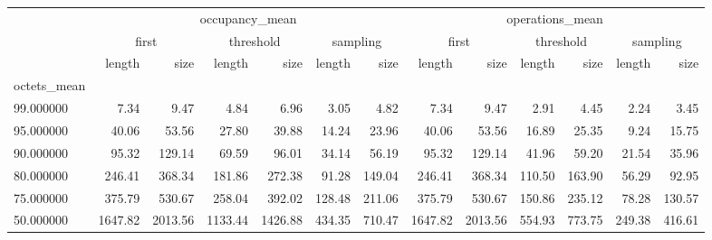 \begin{tabular}{lrrrrrrrrrrrr}
\toprule
 & \multicolumn{6}{c}{occupancy_mean} & \multicolumn{6}{c}{operations_mean} \\
 & \multicolumn{2}{c}{first} & \multicolumn{2}{c}{threshold} & \multicolumn{2}{c}{sampling} & \multicolumn{2}{c}{first} & \multicolumn{2}{c}{threshold} & \multicolumn{2}{c}{sampling} \\
 & length & size & length & size & length & size & length & size & length & size & length & size \\
octets_mean &  &  &  &  &  &  &  &  &  &  &  &  \\
\midrule
99.000000 & 7.34 & 9.47 & 4.84 & 6.96 & 3.05 & 4.82 & 7.34 & 9.47 & 2.91 & 4.45 & 2.24 & 3.45 \\
95.000000 & 40.06 & 53.56 & 27.80 & 39.88 & 14.24 & 23.96 & 40.06 & 53.56 & 16.89 & 25.35 & 9.24 & 15.75 \\
90.000000 & 95.32 & 129.14 & 69.59 & 96.01 & 34.14 & 56.19 & 95.32 & 129.14 & 41.96 & 59.20 & 21.54 & 35.96 \\
80.000000 & 246.41 & 368.34 & 181.86 & 272.38 & 91.28 & 149.04 & 246.41 & 368.34 & 110.50 & 163.90 & 56.29 & 92.95 \\
75.000000 & 375.79 & 530.67 & 258.04 & 392.02 & 128.48 & 211.06 & 375.79 & 530.67 & 150.86 & 235.12 & 78.28 & 130.57 \\
50.000000 & 1647.82 & 2013.56 & 1133.44 & 1426.88 & 434.35 & 710.47 & 1647.82 & 2013.56 & 554.93 & 773.75 & 249.38 & 416.61 \\
\bottomrule
\end{tabular}
